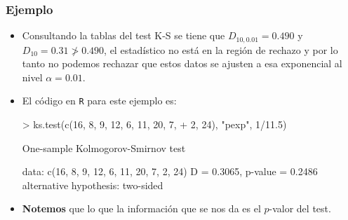 \begin{frame}[fragile]     
\frametitle{Ejemplo}
\begin{itemize}
\item Consultando la tablas del test K-S se tiene que $D_{10,0.01}=0.490$ y $D_{10}=0.31 \not>  0.490$, el estadístico no está en la región de rechazo y por lo tanto no podemos rechazar que
estos datos se ajusten a esa exponencial al nivel $\alpha=0.01$. 
\item El código en \texttt{R} para este ejemplo es:

\begin{Schunk}
\begin{Sinput}
> ks.test(c(16, 8, 9, 12, 6, 11, 20, 7, 
+     2, 24), "pexp", 1/11.5)
\end{Sinput}
\begin{Soutput}
	One-sample Kolmogorov-Smirnov test

data:  c(16, 8, 9, 12, 6, 11, 20, 7, 2, 24) 
D = 0.3065, p-value = 0.2486
alternative hypothesis: two-sided 
\end{Soutput}
\end{Schunk}

\item \textbf{Notemos} que lo que la información que se nos da es el $p$-valor del test.
\end{itemize}
\end{frame}

    


%     







